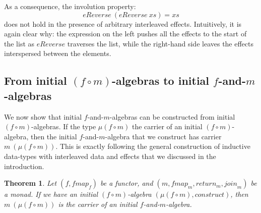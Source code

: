 \documentclass{jfp1}
\newtheorem{theorem}{Theorem}
\begin{document}
As a consequence, the involution property:
\begin{displaymath}
  \mathit{eReverse}~(\mathit{eReverse}~\mathit{xs}) = \mathit{xs}
\end{displaymath}
does not hold in the presence of arbitrary interleaved
effects. Intuitively, it is again clear why: the expression on the
left pushes all the effects to the start of the list as
$\mathit{eReverse}$ traverses the list, while the right-hand side
leaves the effects interspersed between the elements.




\subsection{From initial $(f \circ m)$-algebras to initial $f$-and-$m$-algebras}

We now show that initial $f$-and-$m$-algebras can be constructed from
initial $(f \circ m)$-algebras. If the type $\mu(f \circ m)$ the
carrier of an initial $(f \circ m)$-algebra, then the initial
$f$-and-$m$-algebra that we construct has carrier $m~(\mu (f \circ
m))$. This is exactly following the general construction of inductive
data-types with interleaved data and effects that we discussed in the
introduction.

\begin{theorem}\label{thm:make-initial-f-and-m-alg}
  Let $(f, \mathit{fmap}_f)$ be a functor, and $(m, \mathit{fmap}_m,
  \mathit{return}_m, \mathit{join}_m)$ be a monad.  If we have an
  initial $(f \circ m)$-algebra $(\mu(f \circ m),
  \mathit{construct})$, then $m~(\mu(f \circ m))$ is the carrier of an
  initial $f$-and-$m$-algebra.
\end{theorem}
\end{document}
